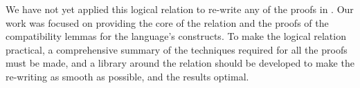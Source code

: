 We have not yet applied this logical relation to re-write any of the proofs in
\ThunkLang{}. Our work was focused on providing the core of the relation and the
proofs of the compatibility lemmas for the language's constructs. To make the
logical relation practical, a comprehensive summary of the techniques required
for all the proofs must be made, and a library around the relation should be
developed to make the re-writing as smooth as possible, and the results optimal.

